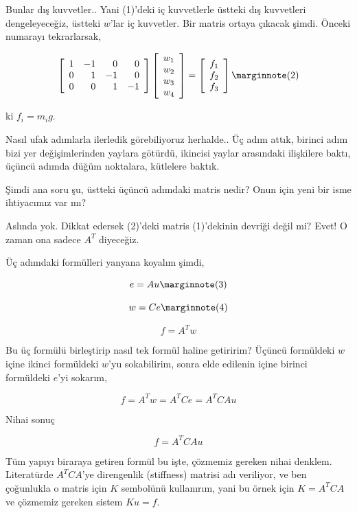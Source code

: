 \documentclass[12pt,fleqn]{article}\usepackage{../../common}
\begin{document}
Bunlar dış kuvvetler.. Yani (1)'deki iç kuvvetlerle üstteki dış kuvvetleri
dengeleyeceğiz, üstteki $w$'lar iç kuvvetler. Bir matris ortaya çıkacak şimdi.
Önceki numarayı tekrarlarsak,

$$
\left[\begin{array}{rrrr}
1 & -1 & 0 & 0 \\ 0 & 1 & -1 & 0 \\ 0 & 0 & 1 & -1 
\end{array}\right]
\left[\begin{array}{c}
w_1 \\ w_2 \\ w_3 \\ w_4
\end{array}\right] =
\left[\begin{array}{c}
f_1 \\ f_2 \\ f_3
\end{array}\right]
\mlabel{2}
$$

ki $f_i = m_i g$. 

Nasıl ufak adımlarla ilerledik görebiliyoruz herhalde.. Üç adım attık, birinci
adım bizi yer değişimlerinden yaylara götürdü, ikincisi yaylar arasındaki
ilişkilere baktı, üçüncü adımda düğüm noktalara, kütlelere baktık.

Şimdi ana soru şu, üstteki üçüncü adımdaki matris nedir? Onun için yeni bir isme
ihtiyacımız var mı?

Aslında yok. Dikkat edersek (2)'deki matris (1)'dekinin devriği değil mi? Evet!
O zaman ona sadece $A^T$ diyeceğiz.

Üç adımdaki formülleri yanyana koyalım şimdi,

$$
e = Au
\mlabel{3}
$$

$$
w = Ce 
\mlabel{4}
$$

$$
f = A^T w
$$

Bu üç formülü birleştirip nasıl tek formül haline getiririm? Üçüncü formüldeki
$w$ içine ikinci formüldeki $w$'yu sokabilirim, sonra elde edilenin içine
birinci formüldeki $e$'yi sokarım,

$$
f = A^T w = A^T C e = A^T C A u
$$

Nihai sonuç

$$
f = A^T C A u
$$

Tüm yapıyı biraraya getiren formül bu işte, çözmemiz gereken nihai denklem.
Literatürde $A^T C A$'ye direngenlik (stiffness) matrisi adı veriliyor, ve ben
çoğunlukla o matris için $K$ sembolünü kullanırım, yani bu örnek için
$K = A^T C A$ ve çözmemiz gereken sistem $K u = f$.
\end{document}

